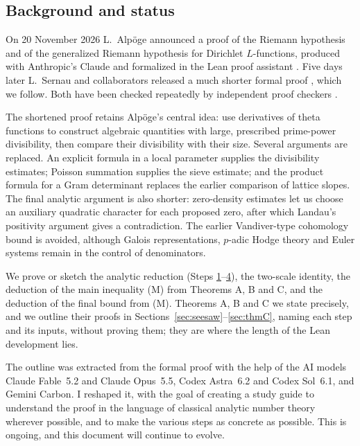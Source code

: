 \documentclass[11pt]{amsart}
\numberwithin{equation}{section}
\theoremstyle{definition}
\theoremstyle{remark}
\begin{document}
\subsection*{Background and status}
On 20 November 2026 L.~Alp\"oge announced a proof of the Riemann hypothesis and of the generalized Riemann hypothesis for Dirichlet $L$-functions, produced with Anthropic's Claude and formalized in the Lean proof assistant \cite{alpoge}. Five days later L.~Sernau and collaborators released a much shorter formal proof \cite{short}, which we follow. Both have been checked repeatedly by independent proof checkers \cite{sutherland}.

The shortened proof retains Alp\"oge's central idea: use derivatives of theta functions to construct algebraic quantities with large, prescribed prime-power divisibility, then compare their divisibility with their size. Several arguments are replaced. An explicit formula in a local parameter supplies the divisibility estimates; Poisson summation supplies the sieve estimate; and the product formula for a Gram determinant replaces the earlier comparison of lattice slopes. The final analytic argument is also shorter: zero-density estimates let us choose an auxiliary quadratic character for each proposed zero, after which Landau's positivity argument gives a contradiction. The earlier Vandiver-type cohomology bound is avoided, although Galois representations, $p$-adic Hodge theory and Euler systems remain in the control of denominators.

We prove or sketch the analytic reduction (Steps \hyperref[step:1]{1}--\hyperref[step:4]{4}), the two-scale identity, the deduction of the main inequality (M) from Theorems A, B and C, and the deduction of the final bound from (M). Theorems A, B and C we state precisely, and we outline their proofs in Sections~\ref{sec:seesaw}--\ref{sec:thmC}, naming each step and its inputs, without proving them; they are where the length of the Lean development lies.

\medskip
The outline was extracted from the formal proof with the help of the AI models Claude Fable~5.2 and Claude Opus~5.5, Codex Astra~6.2 and Codex Sol~6.1, and Gemini Carbon. I reshaped it, with the goal of creating a study guide to understand the proof in the language of classical analytic number theory wherever possible, and to make the various steps as concrete as possible. This is ongoing, and this document will continue to evolve.

\end{document}
